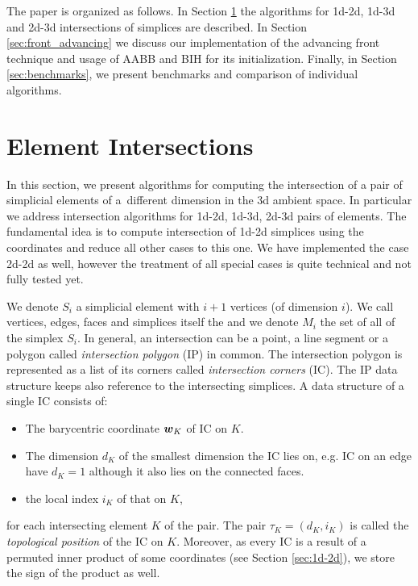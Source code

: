 The paper is organized as follows. In Section \ref{sec:element intersecitons} the algorithms for
1d-2d, 1d-3d and 2d-3d intersections of simplices are described. In Section \ref{sec:front_advancing} we discuss our implementation of the advancing front 
technique and usage of AABB and BIH for its initialization. Finally, in Section \ref{sec:benchmarks}, we present benchmarks and comparison of individual algorithms.


\section{Element Intersections}
\label{sec:element intersecitons}
In this section, we present algorithms for computing the intersection of a pair of simplicial elements of a~different dimension in the 3d ambient space. 
In particular we address intersection algorithms for 1d-2d, 1d-3d, 2d-3d pairs of elements.  The fundamental idea is to compute intersection of 1d-2d 
simplices using the \plucker coordinates and reduce all other cases to this one. We have implemented the case 2d-2d as well, however the treatment 
of all special cases is quite technical and not fully tested yet.

We denote $S_i$ a simplicial element with $i+1$ vertices (of dimension $i$). We call vertices, edges, faces and simplices itself the \nfaces and we denote
$M_i$ the set of all \nfaces of the simplex $S_i$.
In general, an intersection can be a point, a line segment or a polygon called \emph{intersection polygon} (IP) in common.
The intersection polygon is represented as a list of its corners called \emph{intersection corners} (IC). The IP data structure keeps also 
reference to the intersecting simplices. A data structure of a single IC consists of:
\begin{itemize}
 \item The barycentric coordinate $\mathbf{\boldsymbol{w}}_K$ of IC on $K$.
 \item The dimension $d_K$ of the smallest dimension \nface the IC lies on, e.g. IC on an edge have $d_K=1$ although it also lies on the connected faces.
 \item the local index $i_K$ of that \nface on $K$,
\end{itemize}
for each intersecting element $K$ of the pair. The pair $\tau_K = (d_K, i_K)$
is called the \emph{topological position} of the IC on $K$. Moreover, as every IC is a result of a permuted
inner product of some \plucker coordinates (see Section \ref{sec:1d-2d}), we store the sign of the product as well.


